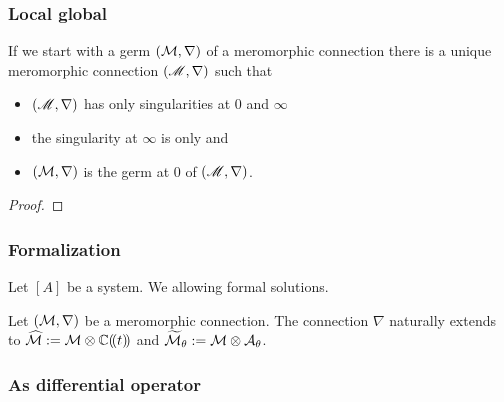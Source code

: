 \subsubsection{Local \rightarrow{} global}
\begin{comment}
  Maybe see: \cite[Thm.3.3.1]{sibuya1990Linear}: G. D. Birkhoff
\end{comment}
\begin{thm}
  \begin{comment}
    Quelle?
  \end{comment}
  If we start with a germ $(\mathcal{M},\nabla)$ of a meromorphic connection there is
  a unique meromorphic connection $(\mathscr{M},\nabla)$ such that
  \begin{itemize}
    \item $(\mathscr{M},\nabla)$ has only singularities at $0$ and $\infty$
    \item the singularity at $\infty$ is only \TODO{} and
    \item $(\mathcal{M},\nabla)$ is the germ at $0$ of $(\mathscr{M},\nabla)$.
  \end{itemize}
\end{thm}
\begin{proof}
  \TODO{}
\end{proof}

\subsubsection{Formalization}
\begin{multicols}{2}
  Let $[A]$ be a system. We  allowing
  formal solutions.
  \TODO{}

\columnbreak

  Let $(\mathcal{M},\nabla)$ be a meromorphic connection. The connection $\nabla$
  naturally extends to $\widehat{\mathcal{M}}:=\mathcal{M}\otimes\mathbb{C}(\!(t)\!)$ and
  $\widetilde{\mathcal{M}}_\theta:=\mathcal{M}\otimes\mathcal{A}_\theta$.
  \TODO{}
\end{multicols}


\subsubsection{As differential operator}
\begin{comment}
  \begin{itemize}
    \item \cite[Sec.4.2]{Loday2014}
  \end{itemize}
\end{comment}

